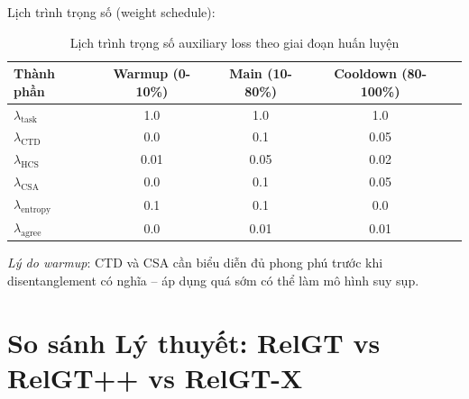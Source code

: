 \documentclass[12pt,a4paper]{article}
\begin{document}
Lịch trình trọng số (weight schedule):

\begin{table}[H]
\centering
\caption{Lịch trình trọng số auxiliary loss theo giai đoạn huấn luyện}
\begin{tabular}{lcccc}
\toprule
\textbf{Thành phần} & \textbf{Warmup (0-10\%)} & \textbf{Main (10-80\%)} & \textbf{Cooldown (80-100\%)} \\
\midrule
$\lambda_\text{task}$ & 1.0 & 1.0 & 1.0 \\
$\lambda_\text{CTD}$ & 0.0 & 0.1 & 0.05 \\
$\lambda_\text{HCS}$ & 0.01 & 0.05 & 0.02 \\
$\lambda_\text{CSA}$ & 0.0 & 0.1 & 0.05 \\
$\lambda_\text{entropy}$ & 0.1 & 0.1 & 0.0 \\
$\lambda_\text{agree}$ & 0.0 & 0.01 & 0.01 \\
\bottomrule
\end{tabular}
\end{table}

\textit{Lý do warmup}: CTD và CSA cần biểu diễn đủ phong phú trước khi
disentanglement có nghĩa -- áp dụng quá sớm có thể làm mô hình suy sụp.

\section{So sánh Lý thuyết: RelGT vs RelGT++ vs RelGT-X}
\end{document}
